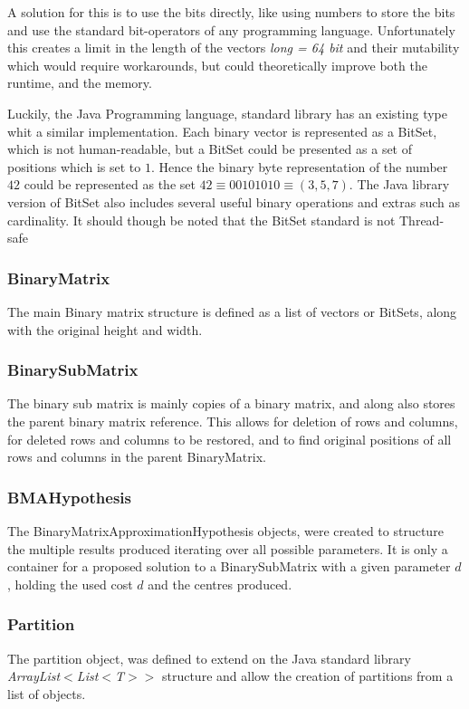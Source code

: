 \documentclass[a4paper]{article}
\begin{document}
A solution for this is to use the bits directly, like using numbers to store the bits and use the standard
bit-operators of any programming language. Unfortunately this creates a limit in the length
of the vectors \textit{long = 64 bit} and their mutability which would require workarounds,
but could theoretically improve both the runtime, and the memory.

Luckily, the Java Programming language, standard library has an existing type whit a similar
implementation. Each binary vector is represented as a BitSet, which is not human-readable, but
a BitSet could be presented as a set of positions which is set to $1$. Hence the binary byte
representation of the number $42$ could be represented as the set
$42 \equiv 00101010 \equiv (3,5,7)$. The Java library version of BitSet also includes several
useful binary operations and extras such as cardinality. It should though be noted that the
BitSet standard is not Thread-safe \cite{bitset_java_17_2021}

\subsubsection{BinaryMatrix}
The main Binary matrix structure is defined as a list of vectors or BitSets, along with the
original height and width.

\subsubsection{BinarySubMatrix}
The binary sub matrix is mainly copies of a binary matrix, and along also stores the parent
binary matrix reference. This allows for deletion of rows and columns, for deleted rows and
columns to be restored, and to find original positions of all rows and columns in the parent
BinaryMatrix.

\subsubsection{BMAHypothesis}
The BinaryMatrixApproximationHypothesis objects, were created to structure the multiple
results produced iterating over all possible parameters. It is only a container for a
proposed solution to a BinarySubMatrix with a given parameter $d$, holding the used cost $d$
and the centres produced.

\subsubsection{Partition}
The partition object, was defined to extend on the Java standard library \textit{ArrayList$<$List$<$T$>>$}
structure and allow the creation of partitions from a list of objects.
\end{document}
